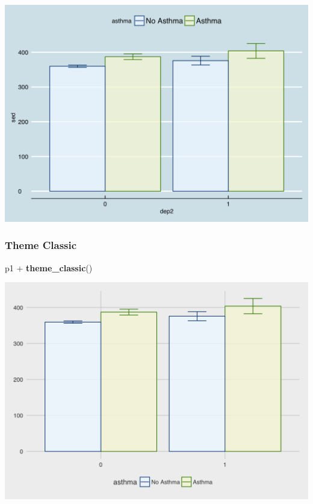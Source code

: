 \documentclass[]{tufte-book}
\newenvironment{Shaded}{}{}
\newcommand{\KeywordTok}[1]{\textcolor[rgb]{0.00,0.44,0.13}{\textbf{#1}}}
\newcommand{\StringTok}[1]{\textcolor[rgb]{0.25,0.44,0.63}{#1}}
\newcommand{\OperatorTok}[1]{\textcolor[rgb]{0.40,0.40,0.40}{#1}}
\newcommand{\NormalTok}[1]{#1}
\theoremstyle{definition}
\theoremstyle{definition}
\theoremstyle{remark}
\begin{document}
\includegraphics{_main_files/figure-latex/unnamed-chunk-150-1}

\subsubsection*{Theme Classic}\label{theme-classic}

\begin{Shaded}
\begin{Highlighting}[]
\NormalTok{p1 }\OperatorTok{+}\StringTok{ }\KeywordTok{theme_classic}\NormalTok{()}
\end{Highlighting}
\end{Shaded}

\includegraphics{_main_files/figure-latex/unnamed-chunk-151-1}
\end{document}
